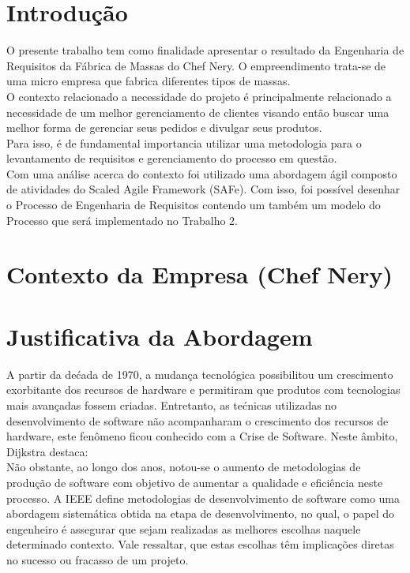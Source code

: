 \newcommand\tab[1][1cm]{\hspace*{#1}}

\section{Introdução}\label{sec}
\tab O presente trabalho tem como finalidade apresentar o resultado da Engenharia de Requisitos da Fábrica de Massas do Chef Nery. O empreendimento trata-se de uma micro empresa que fabrica diferentes tipos de massas.\\
\tab O contexto relacionado a necessidade do projeto é principalmente relacionado a necessidade de um melhor gerenciamento de clientes visando então buscar uma melhor forma de gerenciar seus pedidos e divulgar seus produtos.\\
\tab Para isso, é de fundamental importancia utilizar uma metodologia para o levantamento de requisitos e gerenciamento do processo em questão.\\
\tab Com uma análise acerca do contexto foi utilizado uma abordagem ágil composto de atividades do Scaled Agile Framework (SAFe). Com isso, foi possível desenhar o Processo de Engenharia de Requisitos contendo um também um modelo do Processo que será implementado no Trabalho 2.


\section{Contexto da Empresa (Chef Nery)} %
\label{sec:nova_sess_o}

\section{Justificativa da Abordagem}
\label{sec:nova_sess_o}

\tab A partir da dećada de 1970, a mudança tecnológica  possibilitou um crescimento exorbitante dos recursos de hardware e permitiram que produtos com tecnologias mais avançadas fossem criadas. Entretanto, as tećnicas utilizadas no desenvolvimento  de software não acompanharam o crescimento dos recursos de hardware, este fenômeno ficou conhecido com a Crise de Software. Neste âmbito, Dijkstra destaca:\\


\tab Não obstante,  ao longo dos anos, notou-se o aumento de metodologias de produção de software com objetivo de aumentar a qualidade e eficiência neste processo. A IEEE define metodologias de desenvolvimento de software como uma abordagem sistemática obtida na etapa de desenvolvimento, no qual, o papel do engenheiro é assegurar que sejam realizadas as melhores escolhas naquele determinado contexto. Vale ressaltar, que estas escolhas têm implicações diretas no sucesso ou fracasso de um projeto.\\

